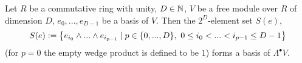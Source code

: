 \begin{proposition}
  Let
    $R$ be a commutative ring with unity,
    $D \in \mathbb{N}$,
    $V$ be a free module over $R$ of dimension $D$,
    $e_0, ..., e_{D - 1}$ be a basis of $V$.
  Then the $2^D$-element set $S(e)$,
  \begin{equation}
    S(e) :=
    \left\{ e_{i_0} \wedge ... \wedge e_{i_{p - 1}} \mid p \in \{0, ..., D\},\ 0 \leq i_0 < ... < i_{p - 1} \leq D - 1 \right\}
  \end{equation}
  (for $p = 0$ the empty wedge product is defined to be $1$)
  forms a basis of $\Lambda^\bullet V$.
\end{proposition}
